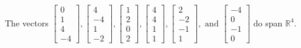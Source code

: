 \begin{exercise}
\begin{exerciseStatement}
  \end{exerciseStatement}
  \begin{exerciseAnswer}
   The vectors \(\left[\begin{array}{r}
0 \\
1 \\
4 \\
-4
\end{array}\right] , \left[\begin{array}{r}
4 \\
-4 \\
1 \\
-2
\end{array}\right] , \left[\begin{array}{r}
1 \\
2 \\
0 \\
2
\end{array}\right] , \left[\begin{array}{r}
4 \\
4 \\
1 \\
1
\end{array}\right] , \left[\begin{array}{r}
2 \\
-2 \\
-1 \\
1
\end{array}\right] , \text{ and } \left[\begin{array}{r}
-4 \\
0 \\
-1 \\
0
\end{array}\right]\) 
  	 do  
	span \(\mathbb{R}^4\).
  


  \end{exerciseAnswer}
\end{exercise}